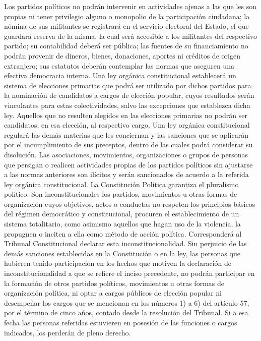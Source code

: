     Los partidos políticos no podrán intervenir en actividades ajenas a las que les son propias ni tener privilegio alguno o monopolio de la participación ciudadana; la nómina de sus militantes se registrará en el servicio electoral del Estado, el que guardará reserva de la misma, la cual será accesible a los militantes del respectivo partido; su contabilidad deberá ser pública; las fuentes de su financiamiento no podrán provenir de dineros, bienes, donaciones, aportes ni créditos de origen extranjero; sus estatutos deberán contemplar las normas que aseguren una efectiva democracia interna. Una ley orgánica constitucional establecerá un sistema de elecciones primarias que podrá ser utilizado por dichos partidos para la nominación de candidatos a cargos de elección popular, cuyos resultados serán vinculantes para estas colectividades, salvo las excepciones que establezca dicha ley. Aquellos que no resulten elegidos en las elecciones primarias no podrán ser candidatos, en esa elección, al respectivo cargo. Una ley orgánica constitucional regulará las demás materias que les conciernan y las sanciones que se aplicarán por el incumplimiento de sus preceptos, dentro de las cuales podrá considerar su disolución. Las asociaciones, movimientos, organizaciones o grupos de personas que persigan o realicen actividades propias de los partidos políticos sin ajustarse a las normas anteriores son ilícitos y serán sancionados de acuerdo a la referida ley orgánica constitucional.
    La Constitución Política garantiza el pluralismo político. Son inconstitucionales los partidos, movimientos u otras formas de organización cuyos objetivos, actos o conductas no respeten los principios básicos del régimen democrático y constitucional, procuren el establecimiento de un sistema totalitario, como asimismo aquellos que hagan uso de la violencia, la propugnen o inciten a ella como método de acción política. Corresponderá al Tribunal Constitucional declarar esta inconstitucionalidad.
    Sin perjuicio de las demás sanciones establecidas en la Constitución o en la ley, las personas que hubieren tenido participación en los hechos que motiven la declaración de inconstitucionalidad a que se refiere el inciso precedente, no podrán participar en la formación de otros partidos políticos, movimientos u otras formas de organización política, ni optar a cargos públicos de elección popular ni desempeñar los cargos que se mencionan en los números 1) a 6) del artículo 57, por el término de cinco años, contado desde la resolución del Tribunal. Si a esa fecha las personas referidas estuvieren en posesión de las funciones o cargos indicados, los perderán de pleno derecho.
